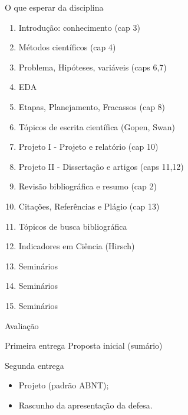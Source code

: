 \documentclass{beamer}
\begin{document}
\begin{frame}{O que esperar da disciplina}
  \begin{enumerate}
  \item<2,7> {Introdução: conhecimento} (cap 3)
  \item<2,7> {Métodos científicos} (cap 4)
  \item<3,7> {Problema, Hipóteses, variáveis} (caps 6,7)
  \item<3,7> {EDA}
  \item<3,7> {Etapas, Planejamento, Fracassos} (cap 8)
  \item<4,7> \alert<7>{Tópicos de escrita científica} (Gopen, Swan)
  \item<5,7> {Projeto I - Projeto e relatório} (cap 10)
  \item<5,7> {Projeto II - Dissertação e artigos} (caps 11,12)
  \item<5,7> {Revisão bibliográfica e resumo} (cap 2)
  \item<5,7> {Citações, Referências e Plágio} (cap 13)
  \item<6,7> {Tópicos de busca bibliográfica}
  \item<6,7> \alert<7>{Indicadores em Ciência} (Hirsch)
  \item<1-> Seminários
  \item<1-> Seminários
  \item<1-> Seminários
  \end{enumerate}
\end{frame}

\begin{frame}{Avaliação}
  \begin{block}{Primeira entrega}
    Proposta inicial (sumário)
  \end{block}

  \pause

  \begin{block}{Segunda entrega}
    \begin{itemize}
    \item Projeto (padrão ABNT);
    \item Rascunho da apresentação da defesa.
    \end{itemize}
  \end{block}

\end{frame}
\end{document}
